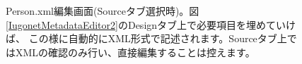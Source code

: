 \begin{figure}[H]
\begin{center}
\caption{Person.xml編集画面(Sourceタブ選択時)。図\ref{IugonetMetadataEditor2}のDesignタブ上で必要項目を埋めていけば、
この様に自動的にXML形式で記述されます。Sourceタブ上ではXMLの確認のみ行い、直接編集することは控えます。}
\label{IugonetMetadataEditor3}
\end{center}
\end{figure}

